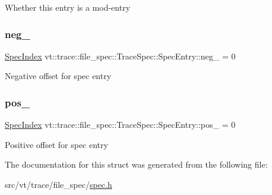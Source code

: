 Whether this entry is a mod-\/entry \mbox{\label{structvt_1_1trace_1_1file__spec_1_1_trace_spec_1_1_spec_entry_a93c7f24ea10d3e82e6fce6965c14ce04}} 
\subsubsection{\texorpdfstring{neg\+\_\+}{neg\_}}
{\footnotesize\ttfamily \hyperlink{structvt_1_1trace_1_1file__spec_1_1_trace_spec_a4dd2e8fb971930351812d0f286baece2}{Spec\+Index} vt\+::trace\+::file\+\_\+spec\+::\+Trace\+Spec\+::\+Spec\+Entry\+::neg\+\_\+ = 0\hspace{0.3cm}{\ttfamily [private]}}

Negative offset for spec entry \mbox{\label{structvt_1_1trace_1_1file__spec_1_1_trace_spec_1_1_spec_entry_a5c6a8881ac5c657c4e2a72ae863968f5}} 
\subsubsection{\texorpdfstring{pos\+\_\+}{pos\_}}
{\footnotesize\ttfamily \hyperlink{structvt_1_1trace_1_1file__spec_1_1_trace_spec_a4dd2e8fb971930351812d0f286baece2}{Spec\+Index} vt\+::trace\+::file\+\_\+spec\+::\+Trace\+Spec\+::\+Spec\+Entry\+::pos\+\_\+ = 0\hspace{0.3cm}{\ttfamily [private]}}

Positive offset for spec entry 

The documentation for this struct was generated from the following file\+:\begin{DoxyCompactItemize}
\item 
src/vt/trace/file\+\_\+spec/\hyperlink{spec_8h}{spec.\+h}\end{DoxyCompactItemize}
